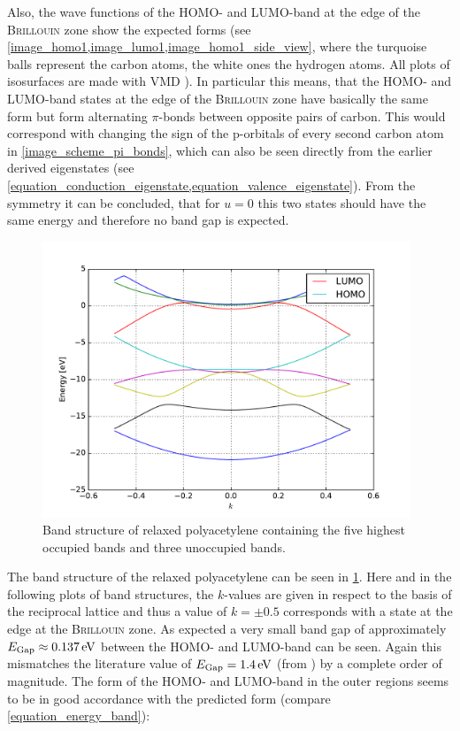 Also, the wave functions of the HOMO- and LUMO-band at the edge of the \textsc{Brillouin} zone show the expected forms (see \cref{image_homo1,image_lumo1,image_homo1_side_view}, where the turquoise balls represent the carbon atoms, the white ones the hydrogen atoms. All plots of isosurfaces are made with VMD \cite{HUMP96}). In particular this means, that the HOMO- and LUMO-band states at the edge of the \textsc{Brillouin} zone have basically the same form but form alternating $\pi$-bonds between opposite pairs of carbon. This would correspond with changing the sign of the p-orbitals of every second carbon atom in \cref{image_scheme_pi_bonds}, which can also be seen directly from the earlier derived eigenstates (see \cref{equation_conduction_eigenstate,equation_valence_eigenstate}). From the symmetry it can be concluded, that for $u=0$ this two states should have the same energy and therefore no band gap is expected.\\
\begin{figure}
	\centering
	\includegraphics[width = 11cm]{Images/polyacetylene/bands/band_structure}
	\caption{Band structure of relaxed polyacetylene containing the five highest occupied bands and three unoccupied bands.}
	\label{image_band_structure_relaxed_polyacetylene}
\end{figure}
The band structure of the relaxed polyacetylene can be seen in \cref{image_band_structure_relaxed_polyacetylene}. Here and in the following plots of band structures, the $k$-values are given in respect to the basis of the reciprocal lattice and thus a value of $k = \pm 0.5$ corresponds with a state at the edge at the \textsc{Brillouin} zone. As expected a very small band gap of approximately $E_\text{Gap} \approx \unit[0.137]{eV}$ between the HOMO- and LUMO-band can be seen. Again this mismatches the literature value of $E_\text{Gap} = \unit[1.4]{eV}$  (from \cite{PhysRevLett.42.1698}) by a complete order of magnitude. The form of the HOMO- and LUMO-band in the outer regions seems to be in good accordance with the predicted form (compare \cref{equation_energy_band}):
